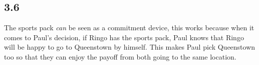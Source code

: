 \documentclass{article}
\begin{document}
\subsection*{3.6}
The sports pack \textit{can} be seen as a commitment device, this works because when it comes to Paul's decision, if Ringo has the sports pack, Paul knows that Ringo will be happy to go to Queenstown by himself. This makes Paul pick Queenstown too so that they can enjoy the payoff from both going to the same location.
\end{document}
